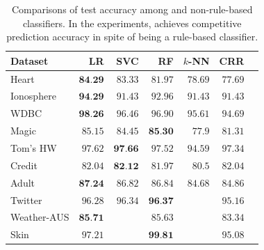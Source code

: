 \begin{table}
	\caption[Accuracy of {\crr} and non-rule-based classifiers]{Comparisons of test accuracy among {\crr} and  non-rule-based classifiers. In the experiments, {\crr} achieves competitive prediction accuracy in spite of being a rule-based classifier.}
	\label{interpretability_crr_tab:all_classifiers}
	\begin{center}
		\begin{tabular}{l   r r r r r  r }
			\toprule
			{Dataset}  & LR & SVC & RF & $k$-NN & CRR\\\midrule
			\multirow{1}{*}{ Heart}   & $   \textbf{84.29}  $    & $   83.33  $    & $   81.97  $    & $   78.69  $    & $   77.69  $   \\ 
			\multirow{1}{*}{ Ionosphere}   & $   \textbf{94.29}  $    & $   91.43  $    & $   92.96  $    & $   91.43  $    & $   91.43  $   \\ 
			\multirow{1}{*}{ WDBC}   & $   \textbf{98.26}  $    & $   96.46  $    & $   96.90  $    & $   95.61  $    & $   94.69  $   \\ 
			\multirow{1}{*}{ Magic}   & $   85.15  $    & $   84.45  $    & $   \textbf{85.30}  $    & $   77.9  $    & $   81.31  $   \\ 
			\multirow{1}{*}{ Tom's HW}   & $   97.62  $    & $   \textbf{97.66}  $    & $   97.52  $    & $   94.59  $    & $   97.34  $   \\ 
			\multirow{1}{*}{ Credit}   & $   82.04  $    & $   \textbf{82.12}  $    & $   81.97  $    & $   80.5  $    & $   82.04  $   \\ 
			\multirow{1}{*}{ Adult}   & $   \textbf{87.24}  $    & $   86.82  $    & $   86.84  $    & $   84.68  $    & $   84.86  $   \\ 
			\multirow{1}{*}{ Twitter}   & $   96.28  $    & $   96.34  $    & $   \textbf{96.37}  $     &  \multicolumn{1}{c}{\textemdash}      & $   95.16  $   \\ 
			\multirow{1}{*}{ Weather-AUS}   & $   \textbf{85.71}  $     &  \multicolumn{1}{c}{\textemdash}      & $   85.63  $     &  \multicolumn{1}{c}{\textemdash}      & $   83.34  $   \\ 
			\multirow{1}{*}{ Skin}   & $   97.21  $     &  \multicolumn{1}{c}{\textemdash}      & $   \textbf{99.81}  $     &  \multicolumn{1}{c}{\textemdash}      & $   95.08  $   \\ 
			\bottomrule
		\end{tabular}
	\end{center}
\end{table}




